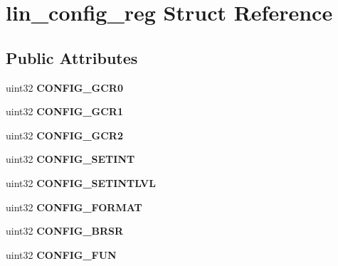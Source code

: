 \hypertarget{structlin__config__reg}{}\section{lin\+\_\+config\+\_\+reg Struct Reference}
\label{structlin__config__reg}
\subsection*{Public Attributes}
\begin{DoxyCompactItemize}
\item 
\mbox{\label{structlin__config__reg_aada1332d90c7ffd91bcd1c513f56db35}} 
uint32 {\bfseries C\+O\+N\+F\+I\+G\+\_\+\+G\+C\+R0}
\item 
\mbox{\label{structlin__config__reg_a5813d43d3f8a9975a911e068bdc0d3d8}} 
uint32 {\bfseries C\+O\+N\+F\+I\+G\+\_\+\+G\+C\+R1}
\item 
\mbox{\label{structlin__config__reg_ab1c12a167c0ef30da0c8ed08a8f86860}} 
uint32 {\bfseries C\+O\+N\+F\+I\+G\+\_\+\+G\+C\+R2}
\item 
\mbox{\label{structlin__config__reg_a5c1a10a4ebd97814245049dbe2b6b2f2}} 
uint32 {\bfseries C\+O\+N\+F\+I\+G\+\_\+\+S\+E\+T\+I\+NT}
\item 
\mbox{\label{structlin__config__reg_a4f8a0a986d201eef45997c3cefc8145d}} 
uint32 {\bfseries C\+O\+N\+F\+I\+G\+\_\+\+S\+E\+T\+I\+N\+T\+L\+VL}
\item 
\mbox{\label{structlin__config__reg_a5980df34b2e424b765af8704aec4dfe6}} 
uint32 {\bfseries C\+O\+N\+F\+I\+G\+\_\+\+F\+O\+R\+M\+AT}
\item 
\mbox{\label{structlin__config__reg_ab2fa172f1d74081b33edeb8c141d292b}} 
uint32 {\bfseries C\+O\+N\+F\+I\+G\+\_\+\+B\+R\+SR}
\item 
\mbox{\label{structlin__config__reg_af381aeb9a1f1cd59d04df77341f57f2b}} 
uint32 {\bfseries C\+O\+N\+F\+I\+G\+\_\+\+F\+UN}
\item 

\end{DoxyCompactItemize}
